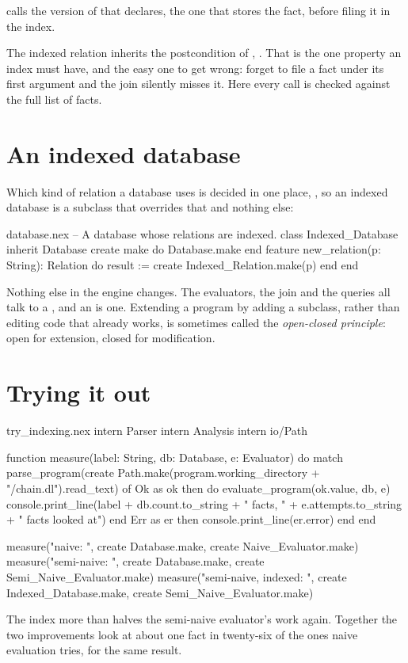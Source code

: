  calls the version of  that 
declares, the one that stores the fact, before filing it in the index.

The indexed relation inherits the postcondition of ,
. That is the one property an index must have, and the easy
one to get wrong: forget to file a fact under its first argument and the
join silently misses it. Here every call is checked against the full list
of facts.

\section{An indexed database}

Which kind of relation a database uses is decided in one place,
, so an indexed database is a subclass that overrides
that and nothing else:

\begin{append}{database.nex}
-- A database whose relations are indexed.
class Indexed_Database inherit Database
create
  make
  do
    Database.make
  end
feature
  new_relation(p: String): Relation
  do
    result := create Indexed_Relation.make(p)
  end
end
\end{append}

Nothing else in the engine changes. The evaluators, the join and the
queries all talk to a , and an  is
one. Extending a program by adding a subclass, rather than editing code
that already works, is sometimes called the \emph{open-closed principle}:
open for extension, closed for modification.

\section{Trying it out}

\begin{tryit}{try_indexing.nex}
intern Parser
intern Analysis
intern io/Path

function measure(label: String, db: Database, e: Evaluator)
do
  match parse_program(create Path.make(program.working_directory + "/chain.dl").read_text) of
    Ok as ok then
      do
        evaluate_program(ok.value, db, e)
        console.print_line(label + db.count.to_string + " facts, "
          + e.attempts.to_string + " facts looked at")
      end
    Err as er then console.print_line(er.error)
  end
end

measure("naive:                ", create Database.make, create Naive_Evaluator.make)
measure("semi-naive:           ", create Database.make, create Semi_Naive_Evaluator.make)
measure("semi-naive, indexed:  ", create Indexed_Database.make, create Semi_Naive_Evaluator.make)
\end{tryit}

The index more than halves the semi-naive evaluator's work again. Together
the two improvements look at about one fact in twenty-six of the ones
naive evaluation tries, for the same result.
